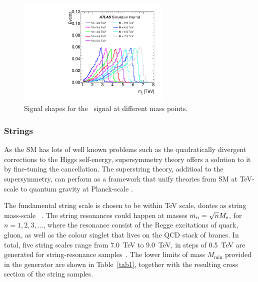 \begin{figure}[htb]
\centering
\includegraphics[width=0.65\textwidth]{fig/benchmark_signals/SignalShape-Hprime.pdf}
\caption{Signal shapes for the \Hprime~signal at different mass points.}
\label{fig:shape_Hprime}
\end{figure}
\FloatBarrier

\subsubsection{Strings}
\label{sec:string} %
As the SM has lots of well known problems such as the quadratically divergent corrections to the Higgs self-energy, supersymmetry theory offers a solution to it by fine-tuning the
cancellation. The superstring theory, additioal to the supersymmetry, can perform as a framework that unify theories from SM at TeV-scale to quantum gravity at Planck-scale . 

The fundamental string scale is chosen to be within TeV scale, dontes as string mass-scale \Ms~. The string resonances could happen at masses $m_n = \sqrt{n} M_\mathrm{s}$, for $n = 1, 2, 3, \ldots$, where the resonance consist of the Regge excitations of quark, gluon, as well as the colour singlet that lives on the QCD stack of branes. In total, five string scales \Ms range from 7.0~TeV to 9.0~TeV, in steps of 0.5~TeV are generated for string-resonance samples~\cite{Anchordoqui:2008hi}. The lower limits of mass $M_\mathrm{min}$ provided in the generator are shown in Table~\ref{tab1}, together with the resulting cross section of the string samples.


